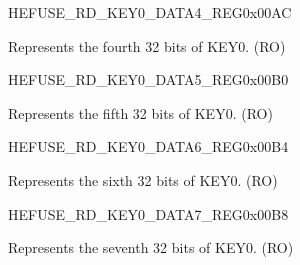 \begin{register}{H}{EFUSE\_RD\_KEY0\_DATA4\_REG}{0x00AC}\label{regdesc:EFUSERDKEY0DATA4REG}
%
\regnewline%
\begin{regdesc}\begin{reglist}
\label{fielddesc:EFUSEKEY0DATA4}\item [EFUSE\_KEY0\_DATA4] Represents the fourth 32 bits of KEY0. (RO)
\end{reglist}\end{regdesc}
\end{register}


\begin{register}{H}{EFUSE\_RD\_KEY0\_DATA5\_REG}{0x00B0}\label{regdesc:EFUSERDKEY0DATA5REG}
%
\regnewline%
\begin{regdesc}\begin{reglist}
\label{fielddesc:EFUSEKEY0DATA5}\item [EFUSE\_KEY0\_DATA5] Represents the fifth 32 bits of KEY0. (RO)
\end{reglist}\end{regdesc}
\end{register}


\begin{register}{H}{EFUSE\_RD\_KEY0\_DATA6\_REG}{0x00B4}\label{regdesc:EFUSERDKEY0DATA6REG}
%
\regnewline%
\begin{regdesc}\begin{reglist}
\label{fielddesc:EFUSEKEY0DATA6}\item [EFUSE\_KEY0\_DATA6] Represents the sixth 32 bits of KEY0. (RO)
\end{reglist}\end{regdesc}
\end{register}


\begin{register}{H}{EFUSE\_RD\_KEY0\_DATA7\_REG}{0x00B8}\label{regdesc:EFUSERDKEY0DATA7REG}
%
\regnewline%
\begin{regdesc}\begin{reglist}
\label{fielddesc:EFUSEKEY0DATA7}\item [EFUSE\_KEY0\_DATA7] Represents the seventh 32 bits of KEY0. (RO)
\end{reglist}\end{regdesc}
\end{register}



